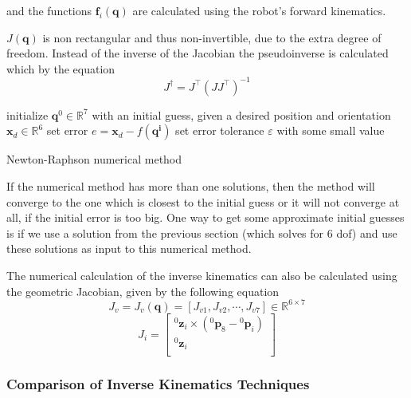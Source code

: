 and the functions $\mathbf{f}_i(\mathbf{q})$ are calculated using the robot's forward kinematics.

$J( \mathbf{q} )$ is non rectangular and thus non-invertible, due to the extra degree of freedom. Instead of the inverse of the Jacobian the pseudoinverse is calculated which by the 
equation
\begin{equation}
J^{\dagger} = J^\top ( J J^\top )^{-1}
\end{equation}

\begin{algorithm}[H]
\SetAlgoLined
initialize $\mathbf{q}^0 \in \mathbb{R}^{7}$ with an initial guess, given a desired position and orientation $\mathbf{x}_d \in \mathbb{R}^{6}$\;
set error $e = \mathbf{x}_d - f(\mathbf{q^i})$\;
set error tolerance $ε$ with some small value\;
\caption{Newton-Raphson numerical method}
\end{algorithm}

If the numerical method has more than one solutions, then the method will converge to the one which is closest to the initial guess or it will not converge at all, 
if the initial error is too big. One way to get some approximate initial guesses is if we use a solution from the previous section (which solves for 6 dof) and use these 
solutions as input to this numerical method.

The numerical calculation of the inverse kinematics can also be calculated using the geometric Jacobian, given by the following equation
\[
J_v = J_v( \mathbf{q} ) = [ J_{v1}, J_{v2}, \cdots, J_{v7} ] \in \mathbb{R}^{6 \times 7}
\]
\begin{equation}
J_i = \begin{bmatrix}
{}^0\mathbf{z}_i \times ({}^0\mathbf{p}_8 - {}^0\mathbf{p}_i) \\
{}^0\mathbf{z}_i \\
\end{bmatrix}
\end{equation}


\subsubsection{Comparison of Inverse Kinematics Techniques}
